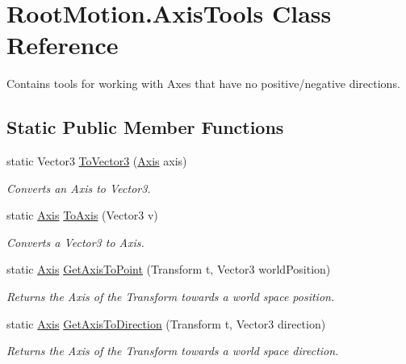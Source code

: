 \hypertarget{class_root_motion_1_1_axis_tools}{}\section{Root\+Motion.\+Axis\+Tools Class Reference}
\label{class_root_motion_1_1_axis_tools}


Contains tools for working with Axes that have no positive/negative directions.  


\subsection*{Static Public Member Functions}
\begin{DoxyCompactItemize}
\item 
static Vector3 \mbox{\hyperlink{class_root_motion_1_1_axis_tools_aea76a99b91ad75567294afd4127bfaca}{To\+Vector3}} (\mbox{\hyperlink{namespace_root_motion_a824e68ffa644559736d5e0bc80919a87}{Axis}} axis)
\begin{DoxyCompactList}\small\item\em Converts an Axis to Vector3. \end{DoxyCompactList}\item 
static \mbox{\hyperlink{namespace_root_motion_a824e68ffa644559736d5e0bc80919a87}{Axis}} \mbox{\hyperlink{class_root_motion_1_1_axis_tools_a97f5d537cd24302aface3eb47624adc1}{To\+Axis}} (Vector3 v)
\begin{DoxyCompactList}\small\item\em Converts a Vector3 to Axis. \end{DoxyCompactList}\item 
static \mbox{\hyperlink{namespace_root_motion_a824e68ffa644559736d5e0bc80919a87}{Axis}} \mbox{\hyperlink{class_root_motion_1_1_axis_tools_a0c0bf43571bb035f94c65ee01d0f51ad}{Get\+Axis\+To\+Point}} (Transform t, Vector3 world\+Position)
\begin{DoxyCompactList}\small\item\em Returns the Axis of the Transform towards a world space position. \end{DoxyCompactList}\item 
static \mbox{\hyperlink{namespace_root_motion_a824e68ffa644559736d5e0bc80919a87}{Axis}} \mbox{\hyperlink{class_root_motion_1_1_axis_tools_a97b9cc0aab4dc328fc2745b2d556cfa0}{Get\+Axis\+To\+Direction}} (Transform t, Vector3 direction)
\begin{DoxyCompactList}\small\item\em Returns the Axis of the Transform towards a world space direction. \end{DoxyCompactList}\item 

\end{DoxyCompactItemize}
